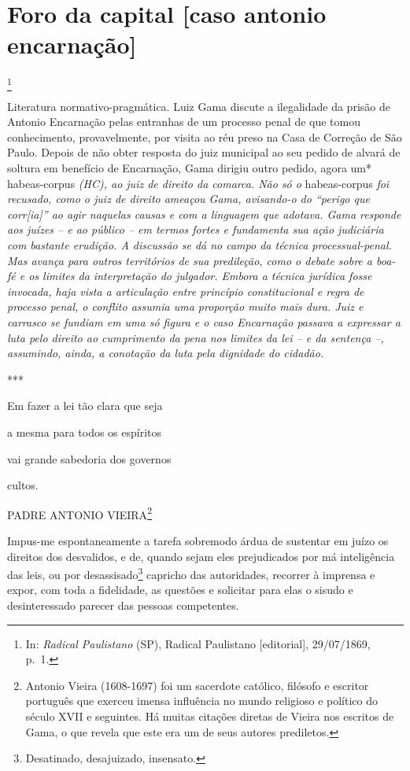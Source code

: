 \chapter{Foro da capital {[}caso antonio encarnação{]}}\footnote{In:
  \emph{Radical Paulistano} (SP), Radical Paulistano {[}editorial{]},
  29/07/1869, p.~1.}

\begin{didascalia}
Literatura normativo-pragmática. Luiz Gama discute a ilegalidade da
prisão de Antonio Encarnação pelas entranhas de um processo penal de que
tomou conhecimento, provavelmente, por visita ao réu preso na Casa de
Correção de São Paulo. Depois de não obter resposta do juiz municipal ao
seu pedido de alvará de soltura em benefício de Encarnação, Gama dirigiu
outro pedido, agora um* habeas-corpus \emph{(HC), ao juiz de direito da
comarca. Não só o} habeas-corpus \emph{foi recusado, como o juiz de
direito ameaçou Gama, avisando-o do ``perigo que corr{[}ia{]}'' ao agir
naquelas causas e com a linguagem que adotava. Gama responde aos juízes
-- e ao público -- em termos fortes e fundamenta sua ação judiciária com
bastante erudição. A discussão se dá no campo da técnica
processual-penal. Mas avança para outros territórios de sua predileção,
como o debate sobre a boa-fé e os limites da interpretação do julgador.
Embora a técnica jurídica fosse invocada, haja vista a articulação entre
princípio constitucional e regra de processo penal, o conflito assumia
uma proporção muito mais dura. Juiz e carrasco se fundiam em uma só
figura e o caso Encarnação passava a expressar a luta pelo direito ao
cumprimento da pena nos limites da lei -- e da sentença --, assumindo,
ainda, a conotação da luta pela dignidade do cidadão.}
\end{didascalia}

***

Em fazer a lei tão clara que seja

a mesma para todos os espíritos

vai grande sabedoria dos governos

cultos.

PADRE ANTONIO VIEIRA\footnote{Antonio Vieira (1608-1697) foi um
  sacerdote católico, filósofo e escritor português que exerceu imensa
  influência no mundo religioso e político do século XVII e seguintes.
  Há muitas citações diretas de Vieira nos escritos de Gama, o que
  revela que este era um de seus autores prediletos.}

Impus-me espontaneamente a tarefa sobremodo árdua de sustentar em juízo
os direitos dos desvalidos, e de, quando sejam eles prejudicados por má
inteligência das leis, ou por desassisado\footnote{Desatinado,
  desajuizado, insensato.} capricho das autoridades, recorrer à imprensa
e expor, com toda a fidelidade, as questões e solicitar para elas o
sisudo e desinteressado parecer das pessoas competentes.

